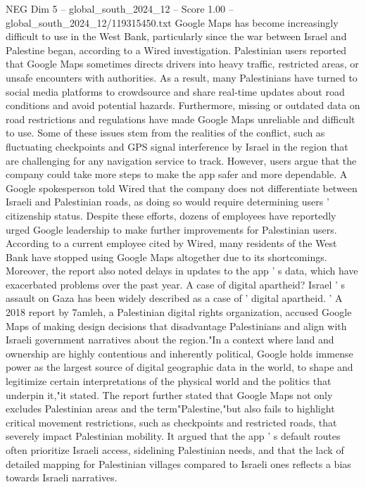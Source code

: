 \begin{textsample}{NEG Dim 5 – global\_south\_2024\_12 – Score 1.00 – global\_south\_2024\_12/119315450.txt}  \label{ex:f5_neg_407}
Google Maps has become increasingly difficult to use in the West Bank, particularly since the war between Israel and Palestine began, according to a Wired investigation.
Palestinian users reported that Google Maps sometimes directs drivers into heavy traffic, restricted areas, or unsafe encounters with authorities.
As a result, many Palestinians have turned to social media platforms to crowdsource and share real-time updates about road conditions and avoid potential hazards.
Furthermore, missing or outdated data on road restrictions and regulations have made Google Maps unreliable and difficult to use.
Some of these issues stem from the realities of the conflict, such as fluctuating checkpoints and GPS signal interference by Israel in the region that are challenging for any navigation service to track.
However, users argue that the company could take more steps to make the app safer and more dependable.
A Google spokesperson told Wired that the company does not differentiate between Israeli and Palestinian roads, as doing so would require determining users ' citizenship status.
Despite these efforts, dozens of employees have reportedly urged Google leadership to make further improvements for Palestinian users.
According to a current employee cited by Wired, many residents of the West Bank have stopped using Google Maps altogether due to its shortcomings.
Moreover, the report also noted delays in updates to the app ' s data, which have exacerbated problems over the past year.
A case of digital apartheid?
Israel ' s assault on Gaza has been widely described as a case of ' digital apartheid. ' A 2018 report by 7amleh, a Palestinian digital rights organization, accused Google Maps of making design decisions that disadvantage Palestinians and align with Israeli government narratives about the region."In a context where land and ownership are highly contentious and inherently political, Google holds immense power as the largest source of digital geographic data in the world, to shape and legitimize certain interpretations of the physical world and the politics that underpin it,"it stated.
The report further stated that Google Maps not only excludes Palestinian areas and the term"Palestine,"but also fails to highlight critical movement restrictions, such as checkpoints and restricted roads, that severely impact Palestinian mobility.
It argued that the app ' s default routes often prioritize Israeli access, sidelining Palestinian needs, and that the lack of detailed mapping for Palestinian villages compared to Israeli ones reflects a bias towards Israeli narratives.

\end{textsample}
